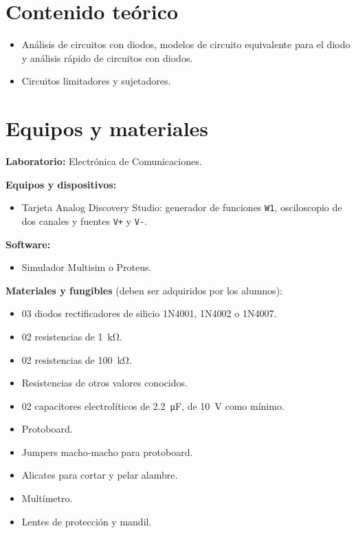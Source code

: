 \documentclass[11pt,a4paper]{article}
\begin{document}
\section{Contenido teórico}
\begin{itemize}
    \item Análisis de circuitos con diodos, modelos de circuito equivalente para el diodo
          y análisis rápido de circuitos con diodos.
    \item Circuitos limitadores y sujetadores.
\end{itemize}

\section{Equipos y materiales}
\noindent\textbf{Laboratorio:} Electrónica de Comunicaciones.

\vspace{0.25cm}
\noindent\textbf{Equipos y dispositivos:}
\begin{itemize}
    \item Tarjeta Analog Discovery Studio: generador de funciones \texttt{W1}, osciloscopio
          de dos canales y fuentes \texttt{V+} y \texttt{V-}.
\end{itemize}

\noindent\textbf{Software:}
\begin{itemize}
    \item Simulador Multisim o Proteus.
\end{itemize}

\vspace{0.25cm}
\noindent\textbf{Materiales y fungibles} (deben ser adquiridos por los alumnos):
\begin{itemize}
    \item 03 diodos rectificadores de silicio 1N4001, 1N4002 o 1N4007.
    \item 02 resistencias de \qty{1}{\kilo\ohm}.
    \item 02 resistencias de \qty{100}{\kilo\ohm}.
    \item Resistencias de otros valores conocidos.
    \item 02 capacitores electrolíticos de \qty{2.2}{\micro\farad}, de \qty{10}{\volt}
          como mínimo.
    \item Protoboard.
    \item Jumpers macho-macho para protoboard.
    \item Alicates para cortar y pelar alambre.
    \item Multímetro.
    \item Lentes de protección y mandil.
\end{itemize}
\end{document}
